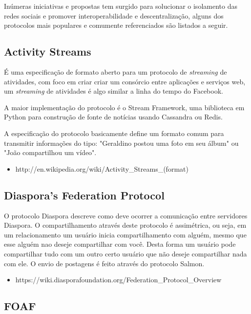 \documentclass[12pt]{article}
\begin{document}
Inúmeras iniciativas e propostas tem surgido para solucionar o isolamento das
redes sociais e promover interoperabilidade e descentralização, alguns
dos protocolos mais populares e comumente referenciados são listados a seguir.

\subsection{Activity Streams}

É uma especificação de formato aberto para um protocolo de {\it streaming} de
atividades, com foco em criar criar um consórcio entre aplicações e serviços
web, um {\it streaming} de atividades é algo similar a linha do tempo do
Facebook.

A maior implementação do protocolo é o Stream Framework\cite{stream}, uma
biblioteca em Python para construção de fonte de notícias usando Cassandra ou
Redis.

A especificação do protocolo\cite{streams} basicamente define um formato comum
para transmitir informações do tipo: "Geraldino postou uma foto em seu álbum"
ou "João compartilhou um vídeo".

\begin{itemize}
  \item http://en.wikipedia.org/wiki/Activity\_Streams\_(format)
\end{itemize}

\subsection{Diaspora's Federation Protocol}

O protocolo Diaspora descreve como deve ocorrer a comunicação entre servidores
Diaspora. O compartilhamento através deste protocolo é assimétrica, ou seja,
em um relacionamento um usuário inicia compartilhamento com alguém, mesmo que
esse alguém nao deseje compartilhar com você. Desta forma um usuário pode
compartilhar tudo com um outro certo usuário que não deseje compartilhar nada
com ele. O envio de postagens é feito através do protocolo Salmon.

\begin{itemize}
  \item https://wiki.diasporafoundation.org/Federation\_Protocol\_Overview
\end{itemize}

\subsection{FOAF}
\end{document}
